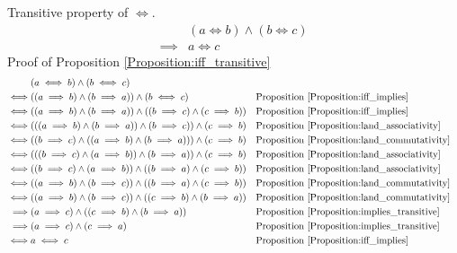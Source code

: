 \begin{prop}
\label{Proposition:iff_transitive}
Transitive property of $\iff$.
\begin{align*}
& (a \iff b) \land (b \iff c) \\
\implies & a \iff c
\end{align*}
Proof of Proposition \ref{Proposition:iff_transitive}
\begin{align*}
& (a \iff b) \land (b \iff c) \\
\iff & ((a \implies b) \land (b \implies a)) \land (b \iff c)
& & \text{Proposition \ref{Proposition:iff_implies}} \\
\iff & ((a \implies b) \land (b \implies a)) \land ((b \implies c) \land (c \implies b))
& & \text{Proposition \ref{Proposition:iff_implies}} \\
\iff & (((a \implies b) \land (b \implies a)) \land (b \implies c)) \land (c \implies b)
& & \text{Proposition \ref{Proposition:land_associativity}} \\
\iff & ((b \implies c) \land ((a \implies b) \land (b \implies a))) \land (c \implies b)
& & \text{Proposition \ref{Proposition:land_commutativity}} \\
\iff & (((b \implies c) \land (a \implies b)) \land (b \implies a)) \land (c \implies b)
& & \text{Proposition \ref{Proposition:land_associativity}} \\
\iff & ((b \implies c) \land (a \implies b)) \land ((b \implies a) \land (c \implies b))
& & \text{Proposition \ref{Proposition:land_associativity}} \\
\iff & ((a \implies b) \land (b \implies c)) \land ((b \implies a) \land (c \implies b))
& & \text{Proposition \ref{Proposition:land_commutativity}} \\
\iff & ((a \implies b) \land (b \implies c)) \land ((c \implies b) \land (b \implies a))
& & \text{Proposition \ref{Proposition:land_commutativity}} \\
\implies & (a \implies c) \land ((c \implies b) \land (b \implies a))
& & \text{Proposition \ref{Proposition:implies_transitive}} \\
\implies & (a \implies c) \land (c \implies a)
& & \text{Proposition \ref{Proposition:implies_transitive}} \\
\iff & a \iff c
& & \text{Proposition \ref{Proposition:iff_implies}} \\
\end{align*}
\end{prop}

